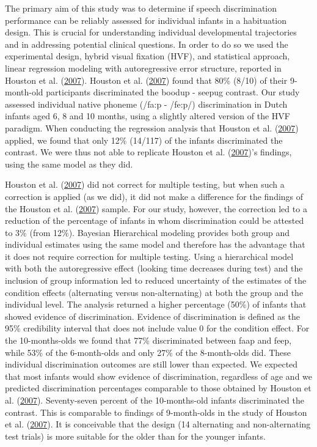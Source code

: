 \documentclass[openright,titlepage,12pt,a4paper]{book}
\begin{document}
The primary aim of this study was to determine if speech discrimination performance can be reliably assessed for individual infants in a habituation design. This is crucial for understanding individual developmental trajectories and in addressing potential clinical questions. In order to do so we used the experimental design, hybrid visual fixation (HVF), and statistical approach, linear regression modeling with autoregressive error structure, reported in Houston et al. (\protect\hyperlink{ref-houston_assessing_2007}{2007}). Houston et al. (\protect\hyperlink{ref-houston_assessing_2007}{2007}) found that 80\% (8/10) of their 9-month-old participants discriminated the boodup - seepug contrast. Our study assessed individual native phoneme (/fa:p - /fe:p/) discrimination in Dutch infants aged 6, 8 and 10 months, using a slightly altered version of the HVF paradigm. When conducting the regression analysis that Houston et al. (\protect\hyperlink{ref-houston_assessing_2007}{2007}) applied, we found that only 12\% (14/117) of the infants discriminated the contrast. We were thus not able to replicate Houston et al. (\protect\hyperlink{ref-houston_assessing_2007}{2007})'s findings, using the same model as they did.

Houston et al. (\protect\hyperlink{ref-houston_assessing_2007}{2007}) did not correct for multiple testing, but when such a correction is applied (as we did), it did not make a difference for the findings of the Houston et al. (\protect\hyperlink{ref-houston_assessing_2007}{2007}) sample. For our study, however, the correction led to a reduction of the percentage of infants in whom discrimination could be attested to 3\% (from 12\%). Bayesian Hierarchical modeling provides both group and individual estimates using the same model and therefore has the advantage that it does not require correction for multiple testing. Using a hierarchical model with both the autoregressive effect (looking time decreases during test) and the inclusion of group information led to reduced uncertainty of the estimates of the condition effects (alternating versus non-alternating) at both the group and the individual level. The analysis returned a higher percentage (50\%) of infants that showed evidence of discrimination. Evidence of discrimination is defined as the 95\% credibility interval that does not include value 0 for the condition effect. For the 10-months-olds we found that 77\% discriminated between faap and feep, while 53\% of the 6-month-olds and only 27\% of the 8-month-olds did. These individual discrimination outcomes are still lower than expected. We expected that most infants would show evidence of discrimination, regardless of age and we predicted discrimination percentages comparable to those obtained by Houston et al. (\protect\hyperlink{ref-houston_assessing_2007}{2007}). Seventy-seven percent of the 10-months-old infants discriminated the contrast. This is comparable to findings of 9-month-olds in the study of Houston et al. (\protect\hyperlink{ref-houston_assessing_2007}{2007}). It is conceivable that the design (14 alternating and non-alternating test trials) is more suitable for the older than for the younger infants.
\end{document}
